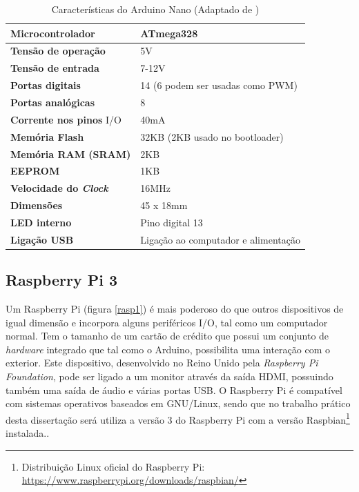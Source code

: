 \newpage

\begin{table}[h]
	\centering
	
	\begin{tabular}{|
			>{\columncolor[HTML]{EFEFEF}}l |l|} \hline
		\textbf{Microcontrolador} & ATmega328 \\ \hline
		\textbf{Tensão de operação} & 5V \\ \hline
		\textbf{Tensão de entrada} & 7-12V \\ \hline
		\textbf{Portas digitais} & 14 (6 podem ser usadas como PWM) \\ \hline
		\textbf{Portas analógicas} & 8 \\ \hline
		\textbf{Corrente nos pinos} \ac{I/O} & 40mA \\ \hline
		\textbf{Memória Flash} & 32KB (2KB usado no bootloader) \\ \hline
		\textbf{Memória \acs{RAM} (SRAM)} & 2KB \\ \hline
		\textbf{EEPROM} & 1KB \\ \hline
		\textbf{Velocidade do \textit{Clock}} & 16MHz \\ \hline
		\textbf{Dimensões} & 45 x 18mm \\ \hline
		\textbf{\ac{LED} interno} & Pino digital 13 \\ \hline
		\textbf{Ligação \ac{USB}} & Ligação ao computador e alimentação \\ \hline
	\end{tabular}
	\caption[Características do Arduino Nano]{Características do Arduino Nano (Adaptado de \cite{Melorose2015})}
	\label{caraarduino}
\end{table}






\subsection{Raspberry Pi 3}

Um Raspberry Pi (figura \ref{rasp1}) é mais poderoso do que outros dispositivos de igual dimensão e incorpora alguns periféricos \ac{I/O}, tal como um computador normal. Tem o tamanho de um cartão de crédito que possui um conjunto de \textit{hardware} integrado que tal como o Arduino, possibilita uma interação com o exterior. Este dispositivo, desenvolvido no Reino Unido pela \textit{Raspberry Pi Foundation}, pode ser ligado a um monitor através da saída HDMI, possuindo também uma saída de áudio e várias portas \ac{USB}. O Raspberry Pi é compatível com sistemas operativos baseados em GNU/Linux, sendo que no trabalho prático desta dissertação será utiliza a versão 3 do Raspberry Pi com a versão Raspbian\footnote{Distribuição Linux oficial do Raspberry Pi:  \url{https://www.raspberrypi.org/downloads/raspbian/}} instalada\cite{RaspberryPiFoundation2012}..

